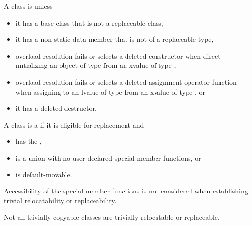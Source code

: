\pnum
A class  is  unless
\begin{itemize}
\item it has a base class that is not a replaceable class,
\item it has a non-static data member that is not of a replaceable type,
\item overload resolution fails or selects a deleted constructor when
direct-initializing an object of type  from an xvalue of type
,

\item overload resolution fails or selects a deleted assignment operator
function when assigning to an lvalue of type  from an xvalue of type
, or

\item it has a deleted destructor.
\end{itemize}

%
\pnum
A class  is a  if it is
eligible for replacement and
\begin{itemize}
\item has the  ,
\item is a union with no user-declared special member functions, or
\item is default-movable.
\end{itemize}

\pnum
\begin{note}
Accessibility of the special member functions is not considered when
establishing trivial relocatability or replaceability.
\end{note}

\pnum
\begin{note}
Not all trivially copyable classes are trivially relocatable or replaceable.
\end{note}

